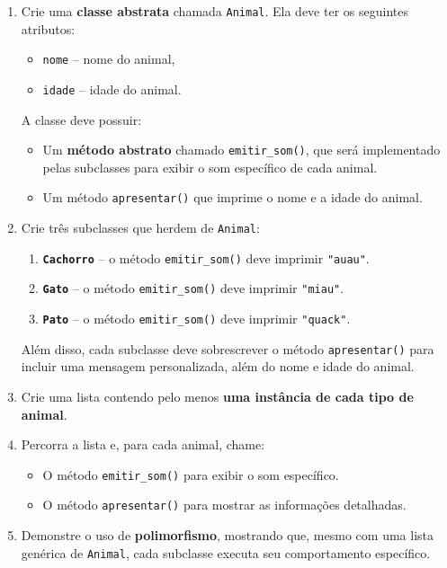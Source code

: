 \documentclass{article}
\begin{document}
\begin{enumerate}
    \item Crie uma \textbf{classe abstrata} chamada \texttt{Animal}.
          Ela deve ter os seguintes atributos:
          \begin{itemize}
              \item \texttt{nome} -- nome do animal,
              \item \texttt{idade} -- idade do animal.
          \end{itemize}

          A classe deve possuir:
          \begin{itemize}
              \item Um \textbf{método abstrato} chamado \texttt{emitir\_som()}, que será implementado pelas subclasses para exibir o som específico de cada animal.
              \item Um método \texttt{apresentar()} que imprime o nome e a idade do animal.
          \end{itemize}

    \item Crie três subclasses que herdem de \texttt{Animal}:
          \begin{enumerate}
              \item \textbf{\texttt{Cachorro}} -- o método \texttt{emitir\_som()} deve imprimir \texttt{"auau"}.
              \item \textbf{\texttt{Gato}} -- o método \texttt{emitir\_som()} deve imprimir \texttt{"miau"}.
              \item \textbf{\texttt{Pato}} -- o método \texttt{emitir\_som()} deve imprimir \texttt{"quack"}.
          \end{enumerate}

          Além disso, cada subclasse deve sobrescrever o método \texttt{apresentar()} para incluir uma
          mensagem personalizada, além do nome e idade do animal.

    \item Crie uma lista contendo pelo menos \textbf{uma instância de cada tipo de animal}.

    \item Percorra a lista e, para cada animal, chame:
          \begin{itemize}
              \item O método \texttt{emitir\_som()} para exibir o som específico.
              \item O método \texttt{apresentar()} para mostrar as informações detalhadas.
          \end{itemize}

    \item Demonstre o uso de \textbf{polimorfismo}, mostrando que, mesmo com uma lista genérica de
          \texttt{Animal}, cada subclasse executa seu comportamento específico.
\end{enumerate}
\end{document}

